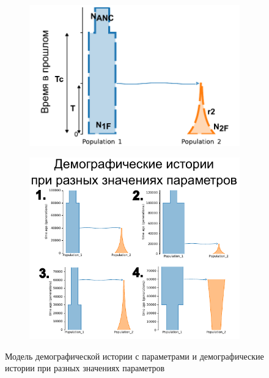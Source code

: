 \begin{figure}[ht]
    \centering
    \begin{subfigure}[c]{.5\textwidth}
    \includegraphics[width=\textwidth]{images_2/picture_2pops_model_2_1.pdf}
    \caption{}
    \label{fig:momi:model_1}
    \end{subfigure}%
    \begin{subfigure}[c]{.49\textwidth}
    \includegraphics[width=\textwidth]{images_2/picture_2pops_model_2_2.pdf}
    \caption{}
    \label{fig:momi:model_2}
    \end{subfigure}
    \caption{Модель демографической истории с параметрами и демографические истории при разных значениях параметров}
    \label{fig:momi:model}
\end{figure}

